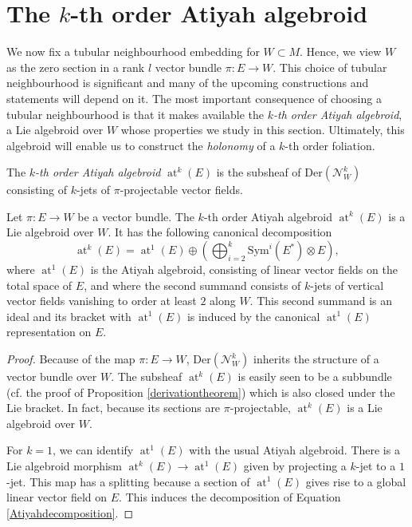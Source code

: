 \documentclass[10pt]{amsart}
\DeclareMathOperator{\at}{at}
\numberwithin{theoremalpha}{section}
\numberwithin{equation}{section}
\numberwithin{definition}{section}
\numberwithin{theorem}{section}
\numberwithin{proposition}{section}
\numberwithin{lemma}{section}
\numberwithin{example}{section}
\numberwithin{remark}{section}
\numberwithin{corollary}{section}
\numberwithin{question}{section}
\numberwithin{problem}{section}
\numberwithin{assumption}{section}
\theoremstyle{named}
\numberwithin{equation}{section}
\begin{document}
\section{The $k$-th order Atiyah algebroid} \label{sec:Atiyah}

We now fix a tubular neighbourhood embedding for $W \subset M$. Hence, we view $W$ as the zero section in a rank $l$ vector bundle $\pi : E \to W$. This choice of tubular neighbourhood is significant and many of the upcoming constructions and statements will depend on it. The most important consequence of choosing a tubular neighbourhood is that it makes available the \emph{$k$-th order Atiyah algebroid}, a Lie algebroid over $W$ whose properties we study in this section. Ultimately, this algebroid will enable us to construct the \emph{holonomy} of a $k$-th order foliation. 

\begin{definition}
The \emph{$k$-th order Atiyah algebroid} $\at^{k}(E)$ is the subsheaf of $\mathrm{Der}(\mathcal{N}_{W}^{k})$ consisting of $k$-jets of $\pi$-projectable vector fields. 
\end{definition}

\begin{lemma} \label{Atiyahalgebroiddecompsition}
Let $\pi : E \rightarrow W$ be a vector bundle. The $k$-th order Atiyah algebroid $\at^{k}(E)$ is a Lie algebroid over $W$. It has the following canonical decomposition
\begin{equation} \label{Atiyahdecomposition}
\at^{k}(E) = \at^{1}(E) \oplus (\bigoplus_{i = 2}^{k}\mathrm{Sym}^{i}(E^*) \otimes E), 
\end{equation}
where $\at^{1}(E)$ is the Atiyah algebroid, consisting of linear vector fields on the total space of $E$, and where the second summand consists of $k$-jets of vertical vector fields vanishing to order at least $2$ along $W$. This second summand is an ideal and its bracket with $\at^{1}(E)$ is induced by the canonical $\at^{1}(E)$ representation on $E$.
\end{lemma}
\begin{proof}
Because of the map $\pi : E \to W$, $\mathrm{Der}(\mathcal{N}_{W}^{k})$ inherits the structure of a vector bundle over $W$. The subsheaf $\at^{k}(E)$ is easily seen to be a subbundle (cf. the proof of Proposition \ref{derivationtheorem}) which is also closed under the Lie bracket. In fact, because its sections are $\pi$-projectable, $\at^{k}(E)$ is a Lie algebroid over $W$.

For $k = 1$, we can identify $\at^{1}(E)$ with the usual Atiyah algebroid. There is a Lie algebroid morphism $ \at^{k}(E) \to \at^{1}(E)$ given by projecting a $k$-jet to a $1$-jet. This map has a splitting because a section of $\at^1(E)$ gives rise to a global linear vector field on $E$. This induces the decomposition of Equation \ref{Atiyahdecomposition}. 
\end{proof}
\end{document}
